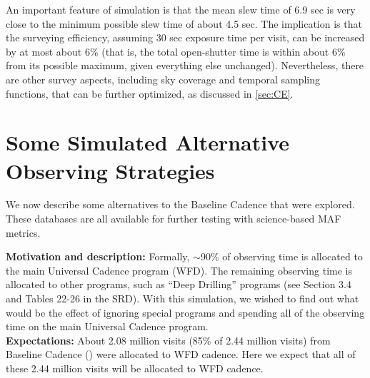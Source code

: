 An important feature of  simulation is that the
mean slew time of 6.9 sec is very close to the minimum possible slew
time of about 4.5 sec. The implication is that the surveying
efficiency, assuming 30 sec exposure time per visit, can be increased
by at most about 6\% (that is, the total open-shutter time is within
about 6\% from its possible maximum, given everything else unchanged).
Nevertheless, there are other survey aspects, including sky coverage
and temporal sampling functions, that can be further optimized, as
discussed in \autoref{sec:CE}.

\navigationbar


\section{Some Simulated Alternative Observing Strategies}
\def\secname{cadexp:alternatives}\label{sec:\secname}

We now describe some alternatives to the Baseline Cadence that were
explored. These \OpSim databases are all available for further testing
with science-based MAF metrics.



{\bf Motivation and description:} Formally, $\sim$90\% of observing
time is allocated to the main Universal Cadence program (WFD). The
remaining observing time is allocated to other programs, such as
``Deep Drilling'' programs (see Section 3.4 and Tables 22-26  in the
SRD). With this simulation, we wished to find out what would be the
effect of ignoring special programs and spending all of the observing
time on the main Universal Cadence program. \\

{\bf Expectations:} About 2.08 million visits (85\% of 2.44 million
visits) from Baseline Cadence () were allocated
to WFD cadence. Here we expect that all of these 2.44 million visits
will be allocated to WFD cadence. \\

